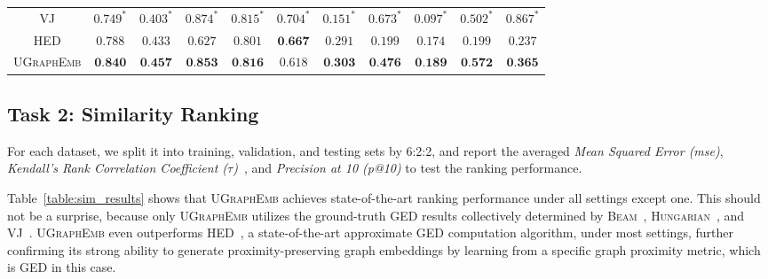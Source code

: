 \documentclass{article}
\newcommand{\model}{\textsc{UGraphEmb}\xspace}
\newcommand{\beam}{\textsc{Beam}\xspace}
\newcommand{\hungarian}{\textsc{Hungarian}\xspace}
\newcommand{\vj}{\textsc{VJ}\xspace}
\newcommand{\hed}{\textsc{HED}\xspace}
\begin{document}
\begin{table*}
\begin{tabular}{ccccccccccc}
    \vj & $0.749^{*}$ & $0.403^{*}$ & $0.874^{*}$ & $0.815^{*}$ & $0.704^{*}$ & $0.151^{*}$ & $0.673^{*}$ & $0.097^{*}$ & $0.502^{*}$ & $0.867^{*}$ \\
    \hed & $0.788$ & $0.433$ & $0.627$ & $0.801$ & $\textbf{0.667}$ & $0.291$ & $0.199$ & $0.174$ & $0.199$ & $0.237$ \\ \hline
\textsc{\model} & $\textbf{0.840}$ & $\textbf{0.457}$ & $\textbf{0.853}$ & $\textbf{0.816}$ & $0.618$ & $\textbf{0.303}$ & $\textbf{0.476}$ & $\textbf{0.189}$ & $\textbf{0.572}$ & $\textbf{0.365}$ \\ \hline
\end{tabular}
\centering
\caption{Similarity ranking performance. \beam, \hungarian, and \vj are three approximate GED computation algorithms returning upper bounds of exact GEDs. We take the minimum GED computed by the three as ground-truth GEDs for training and evaluating all the methods on both Task 1 and 2. Their results are labeled with ``$*$''. \hed is another GED solver yielding lower bounds. ``-'' indicates that the computation did not finish after 72 hours.}
\label{table:sim_results}
\end{table*}










\subsection{Task 2: Similarity Ranking}


For each dataset, we split it into training, validation, and testing sets by 6:2:2, and report the averaged \textit{Mean Squared Error (mse)}, \textit{Kendall's Rank Correlation Coefficient ($\tau$)}~\cite{kendall1938new}, and \textit{Precision at 10 (p@10)} to test the ranking performance. 


Table~\ref{table:sim_results} shows that \model achieves state-of-the-art ranking performance under all settings except one. This should not be a surprise, because only \model utilizes the ground-truth GED results collectively determined by \beam~\cite{neuhaus2006fast}, \hungarian~\cite{riesen2009approximate}, and \vj~\cite{fankhauser2011speeding}. \model even outperforms \hed~\cite{fischer2015approximation}, a state-of-the-art approximate GED computation algorithm, under most settings, further confirming its strong ability to generate proximity-preserving graph embeddings by learning from a specific graph proximity metric, which is GED in this case.
\end{document}
